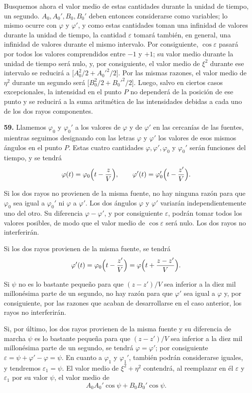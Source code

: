 Busquemos ahora el valor medio de estas cantidades
durante la unidad de tiempo, un segundo. $A_0,A_0',B_0,B_0'$ deben
entonces considerarse como variables; lo mismo ocurre con $\varphi$ y
$\varphi'$, y como estas cantidades toman una infinidad de valores
durante la unidad de tiempo, la cantidad $\varepsilon$ tomará también, en
general, una infinidad de valores durante el mismo intervalo. Por
consiguiente, $\cos\varepsilon$ pasará por todos los valores comprendidos
entre $-1$ y $+1$; su valor medio durante la unidad de tiempo será nulo,
y, por consiguiente, el valor medio de $\xi^2$ durante ese intervalo se
reducirá a $\bigl[A_0^2/2+A_0'^2/2\bigr]$. Por las mismas razones, el
valor medio de $\eta^2$ durante un segundo será
$\bigl[B_0^2/2+B_0'^2/2\bigr]$. Luego, salvo en ciertos casos
excepcionales, la intensidad en el punto $P$ no dependerá de la posición
de ese punto y se reducirá a la suma aritmética de las intensidades
debidas a cada uno de los dos rayos componentes.

\noindent\textbf{59.} Llamemos $\varphi_0$ y $\varphi_0'$ a los valores de $\varphi$ y de
$\varphi'$ en las cercanías de las fuentes, mientras seguimos designando
con las letras $\varphi$ y $\varphi'$ los valores de esos mismos ángulos
en el punto $P$. Estas cuatro cantidades $\varphi,\varphi',\varphi_0$ y
$\varphi_0'$ serán funciones del tiempo, y se tendrá
\[
\varphi(t)=\varphi_0\Bigl(t-\frac{z}{V}\Bigr),\qquad
\varphi'(t)=\varphi_0'\Bigl(t-\frac{z'}{V}\Bigr).
\]

Si los dos rayos no provienen de la misma fuente, no hay ninguna razón
para que $\varphi_0$ sea igual a $\varphi_0'$ ni $\varphi$ a $\varphi'$.
Los dos ángulos $\varphi$ y $\varphi'$ variarán independientemente uno
del otro. Su diferencia $\varphi-\varphi'$, y por consiguiente
$\varepsilon$, podrán tomar todos los valores posibles, de modo que el
valor medio de $\cos\varepsilon$ será nulo. Los dos rayos no
interferirán.

Si los dos rayos provienen de la misma fuente, se tendrá
\[
\varphi'(t)=\varphi_0\Bigl(t-\frac{z'}{V}\Bigr)
=\varphi\Bigl(t+\frac{z-z'}{V}\Bigr).
\]

Si $\psi$ no es lo bastante pequeño para que $(z-z')/V$ sea inferior a la
diez mil millonésima parte de un segundo, no hay razón para que $\varphi'$
sea igual a $\varphi$ y, por consiguiente, por las razones que acaban de
desarrollarse en el caso anterior, los rayos no interferirán.

Si, por último, los dos rayos provienen de la misma fuente y su
diferencia de marcha $\psi$ es lo bastante pequeña para que $(z-z')/V$
sea inferior a la diez mil millonésima parte de un segundo, se tendrá
$\varphi=\varphi'$; por consiguiente
$\varepsilon=\psi+\varphi'-\varphi=\psi$. En cuanto a $\varphi_1$ y
$\varphi_1'$, también podrán considerarse iguales, y tendremos
$\varepsilon_1=\psi$. El valor medio de
$\xi^2+\eta^2$ contendrá, al reemplazar en él $\varepsilon$ y
$\varepsilon_1$ por su valor $\psi$, el valor medio de
\[
A_0A_0'\cos\psi+B_0B_0'\cos\psi.
\]

